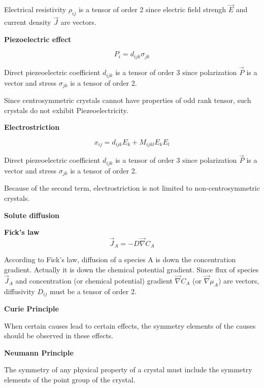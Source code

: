 Electrical resistivity $\rho_{ij}$ is a tensor of order 2 since electric field strengh $\vec{E}$ and current density  $\vec{J}$ are vectors.



{\bf Piezoelectric effect}

$$ P_i = d_{ijk} \sigma_{jk} $$

Direct piezeoelectric coefficient $d_{ijk}$ is a tensor of order 3 since polarization $\vec{P}$ is a vector and stress $\sigma_{jk}$ is a tensor of order 2.

Since centrosymmetric crystals cannot have properties of odd rank tensor, such crystals do not exhibit Piezeoelectricity.


{\bf Electrostriction}

$$ x_{ij} = d_{ijk} E_k + M_{ijkl} E_k E_l $$

Direct piezeoelectric coefficient $d_{ijk}$ is a tensor of order 3 since polarization $\vec{P}$ is a vector and stress $\sigma_{jk}$ is a tensor of order 2.

Because of the second term, electrostriction is not limited to non-centrosymmetric crystals.



{\bf Solute diffusion}

{\bf Fick's law}
$$ \vec{J}_A = -D \vec{\nabla} C_A $$

According to Fick's law, diffusion of a species A is down the concentration gradient. Actually it is down the chemical potential gradient. Since flux of species $\vec{J}_A$ and concentration (or chemical potential) gradient $\vec{\nabla} C_A$ (or $\vec{\nabla} \mu_A$) are vectors, diffusivity $D_{ij}$ must be a tensor of order 2.




{\bf Curie Principle}


When certain causes lead to certain effects, the symmetry elements of the causes should be observed in these effects.



{\bf Neumann Principle}

The symmetry of any physical property of a crystal must include the symmetry elements of the point group of the crystal.

